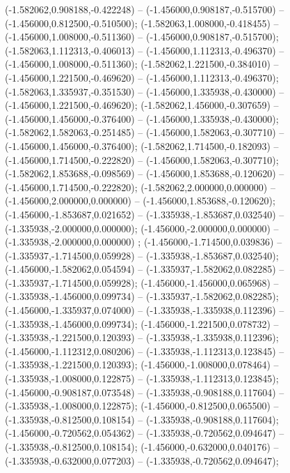  (-1.582062,0.908188,-0.422248) -- (-1.456000,0.908187,-0.515700) -- (-1.456000,0.812500,-0.510500);
 (-1.582063,1.008000,-0.418455) -- (-1.456000,1.008000,-0.511360) -- (-1.456000,0.908187,-0.515700);
 (-1.582063,1.112313,-0.406013) -- (-1.456000,1.112313,-0.496370) -- (-1.456000,1.008000,-0.511360);
 (-1.582062,1.221500,-0.384010) -- (-1.456000,1.221500,-0.469620) -- (-1.456000,1.112313,-0.496370);
 (-1.582063,1.335937,-0.351530) -- (-1.456000,1.335938,-0.430000) -- (-1.456000,1.221500,-0.469620);
 (-1.582062,1.456000,-0.307659) -- (-1.456000,1.456000,-0.376400) -- (-1.456000,1.335938,-0.430000);
 (-1.582062,1.582063,-0.251485) -- (-1.456000,1.582063,-0.307710) -- (-1.456000,1.456000,-0.376400);
 (-1.582062,1.714500,-0.182093) -- (-1.456000,1.714500,-0.222820) -- (-1.456000,1.582063,-0.307710);
 (-1.582062,1.853688,-0.098569) -- (-1.456000,1.853688,-0.120620) -- (-1.456000,1.714500,-0.222820);
 (-1.582062,2.000000,0.000000) -- (-1.456000,2.000000,0.000000) -- (-1.456000,1.853688,-0.120620);
 (-1.456000,-1.853687,0.021652) -- (-1.335938,-1.853687,0.032540) -- (-1.335938,-2.000000,0.000000);
 (-1.456000,-2.000000,0.000000) -- (-1.335938,-2.000000,0.000000) ;
 (-1.456000,-1.714500,0.039836) -- (-1.335937,-1.714500,0.059928) -- (-1.335938,-1.853687,0.032540);
 (-1.456000,-1.582062,0.054594) -- (-1.335937,-1.582062,0.082285) -- (-1.335937,-1.714500,0.059928);
 (-1.456000,-1.456000,0.065968) -- (-1.335938,-1.456000,0.099734) -- (-1.335937,-1.582062,0.082285);
 (-1.456000,-1.335937,0.074000) -- (-1.335938,-1.335938,0.112396) -- (-1.335938,-1.456000,0.099734);
 (-1.456000,-1.221500,0.078732) -- (-1.335938,-1.221500,0.120393) -- (-1.335938,-1.335938,0.112396);
 (-1.456000,-1.112312,0.080206) -- (-1.335938,-1.112313,0.123845) -- (-1.335938,-1.221500,0.120393);
 (-1.456000,-1.008000,0.078464) -- (-1.335938,-1.008000,0.122875) -- (-1.335938,-1.112313,0.123845);
 (-1.456000,-0.908187,0.073548) -- (-1.335938,-0.908188,0.117604) -- (-1.335938,-1.008000,0.122875);
 (-1.456000,-0.812500,0.065500) -- (-1.335938,-0.812500,0.108154) -- (-1.335938,-0.908188,0.117604);
 (-1.456000,-0.720562,0.054362) -- (-1.335938,-0.720562,0.094647) -- (-1.335938,-0.812500,0.108154);
 (-1.456000,-0.632000,0.040176) -- (-1.335938,-0.632000,0.077203) -- (-1.335938,-0.720562,0.094647);
